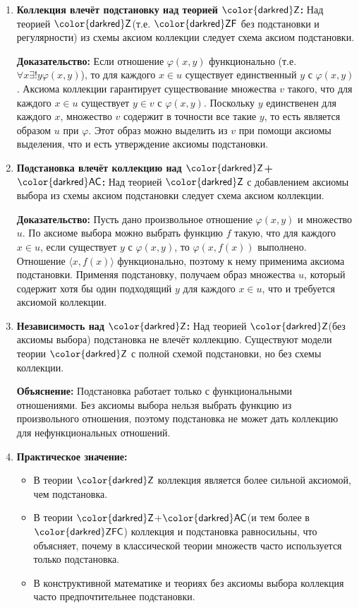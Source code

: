 \documentclass[11pt, a4paper]{extarticle}
\newcommand{\ph}{\varphi}
\newcommand{\AC}{\ifmmode \mathsf{\color{darkred}AC}\else ${\mathsf{\color{darkred}AC}}$\fi\xspace}
\newcommand{\ZF}{\ifmmode \mathsf{\color{darkred}ZF}\else ${\mathsf{\color{darkred}ZF}}$\fi\xspace}
\newcommand{\Zermelo}{\ifmmode \mathsf{\color{darkred}Z}\else ${\mathsf{\color{darkred}Z}}$\fi\xspace}
\newcommand{\ZFC}{\ifmmode \mathsf{\color{darkred}ZFC}\else ${\mathsf{\color{darkred}ZFC}}$\fi\xspace}
\begin{document}
\begin{theorem}\;
\begin{enumerate}
    \item \textbf{Коллекция влечёт подстановку над теорией \Zermelo:} Над теорией \Zermelo (т.е. \ZF без подстановки и регулярности) из схемы аксиом коллекции следует схема аксиом подстановки.
    
    \textbf{Доказательство:} Если отношение $\ph(x,y)$ функционально (т.е. $\forall x \exists! y \ph(x,y)$), то для каждого $x \in u$ существует единственный $y$ с $\ph(x,y)$. Аксиома коллекции гарантирует существование множества $v$ такого, что для каждого $x \in u$ существует $y \in v$ с $\ph(x,y)$. Поскольку $y$ единственен для каждого $x$, множество $v$ содержит в точности все такие $y$, то есть является образом $u$ при $\ph$. Этот образ можно выделить из $v$ при помощи аксиомы выделения, что и есть утверждение аксиомы подстановки.
    
    \item \textbf{Подстановка влечёт коллекцию над \Zermelo+\AC:} Над теорией \Zermelo с добавлением аксиомы выбора из схемы аксиом подстановки следует схема аксиом коллекции.
    
    \textbf{Доказательство:} Пусть дано произвольное отношение $\ph(x,y)$ и множество $u$. По аксиоме выбора можно выбрать функцию $f$ такую, что для каждого $x \in u$, если существует $y$ с $\ph(x,y)$, то $\ph(x, f(x))$ выполнено. Отношение $\langle x, f(x) \rangle$ функционально, поэтому к нему применима аксиома подстановки. Применяя подстановку, получаем образ множества $u$, который содержит хотя бы один подходящий $y$ для каждого $x \in u$, что и требуется аксиомой коллекции.
    
    \item \textbf{Независимость над \Zermelo:} Над теорией \Zermelo (без аксиомы выбора) подстановка не влечёт коллекцию. Существуют модели теории \Zermelo с полной схемой подстановки, но без схемы коллекции.
    
    \textbf{Объяснение:} Подстановка работает только с функциональными отношениями. Без аксиомы выбора нельзя выбрать функцию из произвольного отношения, поэтому подстановка не может дать коллекцию для нефункциональных отношений.
    
    \item \textbf{Практическое значение:} 
    \begin{itemize}
        \item В теории \Zermelo коллекция является более сильной аксиомой, чем подстановка.
        \item В теории \Zermelo+\AC (и тем более в \ZFC) коллекция и подстановка равносильны, что объясняет, почему в классической теории множеств часто используется только подстановка.
        \item В конструктивной математике и теориях без аксиомы выбора коллекция часто предпочтительнее подстановки.
    \end{itemize}
\end{enumerate}
\end{theorem}
\end{document}
